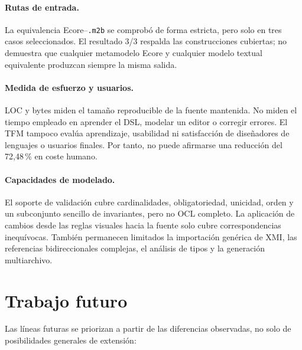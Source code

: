 \paragraph{Rutas de entrada.}
La equivalencia Ecore--\texttt{.m2b} se comprobó de forma estricta, pero solo en
tres casos seleccionados. El resultado 3/3 respalda las construcciones
cubiertas; no demuestra que cualquier metamodelo Ecore y cualquier modelo
textual equivalente produzcan siempre la misma salida.

\paragraph{Medida de esfuerzo y usuarios.}
LOC y bytes miden el tamaño reproducible de la fuente mantenida. No miden el
tiempo empleado en aprender el DSL, modelar un editor o corregir errores. El TFM
tampoco evalúa aprendizaje, usabilidad ni satisfacción de diseñadores de
lenguajes o usuarios finales. Por tanto, no puede afirmarse una reducción del
72,48\,\% en coste humano.

\paragraph{Capacidades de modelado.}
El soporte de validación cubre cardinalidades, obligatoriedad, unicidad, orden y
un subconjunto sencillo de invariantes, pero no OCL completo. La aplicación de
cambios desde las reglas visuales hacia la fuente solo cubre correspondencias
inequívocas. También permanecen limitados la importación genérica de XMI, las
referencias bidireccionales complejas, el análisis de tipos y la generación
multiarchivo.

\section{Trabajo futuro}
\label{sec:trabajo-futuro}

Las líneas futuras se priorizan a partir de las diferencias observadas, no solo
de posibilidades generales de extensión:

